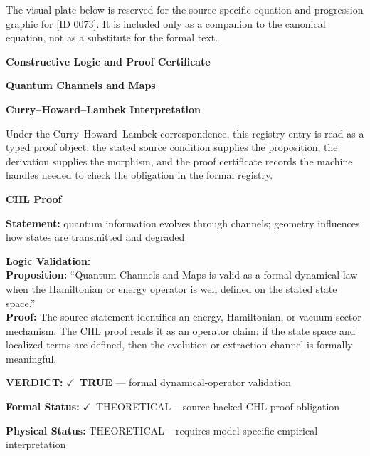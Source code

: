 \begingroup\footnotesize\sloppy
The visual plate below is reserved for the source-specific equation and progression graphic for [ID 0073]. It is included only as a companion to the canonical equation, not as a substitute for the formal text.
\par\endgroup
\ifTZPDarkEdition
{}
\fi

\clearpage
\begingroup\tzpsupportsetup
\noindent\textbf{\fontsize{10.8pt}{12.8pt}\selectfont [ID 0073] Constructive Logic and Proof Certificate}\par
\noindent\textbf{\fontsize{10pt}{12pt}\selectfont Quantum Channels and Maps}\par
\vspace{0.45em}
\begingroup
\footnotesize
\setlength{\parskip}{0.22em}
\setlength{\parindent}{0pt}
\noindent\textbf{Curry--Howard--Lambek Interpretation}\par
Under the Curry--Howard--Lambek correspondence, this registry entry is read as a typed proof
object: the stated source condition supplies the proposition, the derivation supplies the
morphism, and the proof certificate records the machine handles needed to check the obligation
in the formal registry.

\vspace{0.45em}
\noindent\textbf{CHL Proof}\par
\textbf{Statement:} quantum information evolves through channels; geometry influences how states are
transmitted and degraded

\textbf{Logic Validation:}\\
\textbf{Proposition:} ``Quantum Channels and Maps is valid as a formal dynamical law when the Hamiltonian or
energy operator is well defined on the stated state space.''\\
\textbf{Proof:} The source statement identifies an energy, Hamiltonian, or vacuum-sector mechanism. The
CHL proof reads it as an operator claim: if the state space and localized terms are
defined, then the evolution or extraction channel is formally meaningful.

\textbf{VERDICT:} \ensuremath{\checkmark}\ \textbf{TRUE} --- formal dynamical-operator validation

\textbf{Formal Status:} \ensuremath{\checkmark}\ THEORETICAL -- source-backed CHL proof obligation

\textbf{Physical Status:} THEORETICAL -- requires model-specific empirical interpretation
\par\vspace{0.45em}
\par
\ifTZPDarkEdition
{}
\fi
\endgroup
\endgroup
